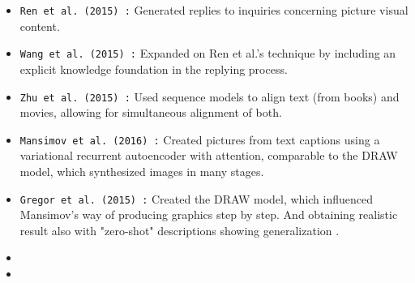 \begin{itemize}[noitemsep]
    \item \texttt{Ren et al. (2015) :}
    Generated replies to inquiries concerning picture visual content.

    \item \texttt{Wang et al. (2015) :}
    Expanded on Ren et al.'s technique by including an explicit knowledge foundation in the replying process.

    \item \texttt{Zhu et al. (2015) :}
    Used sequence models to align text (from books) and movies, allowing for simultaneous alignment of both.

    \item \texttt{Mansimov et al. (2016) :}
    Created pictures from text captions using a variational recurrent autoencoder with attention, 
    comparable to the DRAW model, which synthesized images in many stages.

    \item \texttt{Gregor et al. (2015) :}
    Created the DRAW model, which influenced Mansimov's way of producing graphics step by step.
    And obtaining realistic result also with "zero-shot" descriptions showing generalization . 

    \item \texttt{}
    \item \texttt{}


\end{itemize}